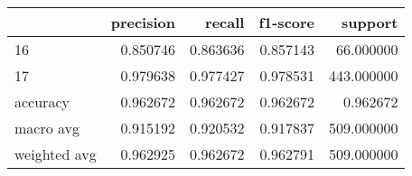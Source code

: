 \begin{tabular}{lrrrr}
\toprule
 & precision & recall & f1-score & support \\
\midrule
16 & 0.850746 & 0.863636 & 0.857143 & 66.000000 \\
17 & 0.979638 & 0.977427 & 0.978531 & 443.000000 \\
accuracy & 0.962672 & 0.962672 & 0.962672 & 0.962672 \\
macro avg & 0.915192 & 0.920532 & 0.917837 & 509.000000 \\
weighted avg & 0.962925 & 0.962672 & 0.962791 & 509.000000 \\
\bottomrule
\end{tabular}
